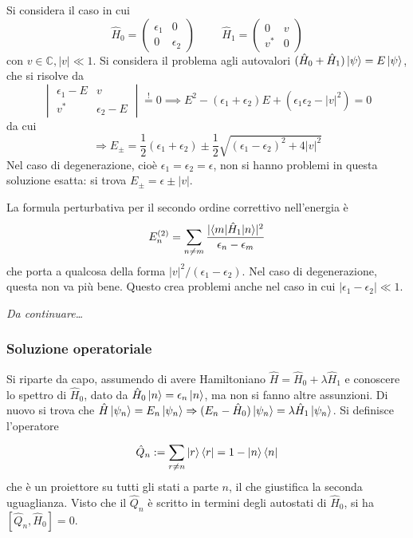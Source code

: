 \documentclass[11pt, a4paper]{scrartcl} %
\numberwithin{equation}{subsection}
\theoremstyle{style2}
\theoremstyle{style1}
\begin{document}
Si considera il caso in cui 
\[
	\hat{H}_0 = \begin{pmatrix} \epsilon _1 & 0 \\ 0& \epsilon _2 \end{pmatrix} \hspace{1cm}\hat{H}_1 = \begin{pmatrix} 0 & v \\ v^* & 0\end{pmatrix}  
\] 
con $v \in \mathbb{C}, \lvert v \rvert \ll 1$.
Si considera il problema agli autovalori $(\hat{H}_0 + \hat{H}_1) \ket{\psi } = E \ket{\psi } $, che si risolve da 
\[
		\begin{vmatrix} \epsilon _1 - E & v \\ v^* & \epsilon _2 - E \end{vmatrix} \stackrel{!}{=} 0 \implies E^2 - (\epsilon _1 + \epsilon _2) E + (\epsilon _1\epsilon _2 - \lvert v \rvert ^2 ) = 0 
\] 
da cui
\begin{equation}\label{2lsol}
		\Rightarrow E_{\pm} = \frac{1}{2}(\epsilon _1 + \epsilon _2) \pm \frac{1}{2}\sqrt{(\epsilon _1-\epsilon _2)^2 + 4 \lvert v \rvert ^2} 
\end{equation}
Nel caso di degenerazione, cio\`e $\epsilon _1 = \epsilon _{2}=\epsilon  $, non si hanno problemi in questa soluzione esatta: si trova $E_{\pm} = \epsilon \pm \lvert v \rvert $.

La formula perturbativa per il secondo ordine correttivo nell'energia \`e
\[
E_n^{(2)} = \sum_{n\neq m}^{} \frac{\lvert \braket{m|\hat{H}_1|n}  \rvert ^2}{\epsilon _n-\epsilon _m} 
\] 
che porta a qualcosa della forma $\lvert v \rvert ^2 / (\epsilon _1 - \epsilon _2)$.
Nel caso di degenerazione, questa non va pi\`u bene.
Questo crea problemi anche nel caso in cui $\lvert \epsilon _1 - \epsilon _2 \rvert \ll 1$.
\begin{center}
	\textit{Da continuare\ldots} 
\end{center}
\subsubsection{Soluzione operatoriale}

Si riparte da capo, assumendo di avere Hamiltoniano $\hat{H} = \hat{H}_0 + \lambda \hat{H}_1$ e conoscere lo spettro di $\hat{H}_0$, dato da $\hat{H}_0 \ket{n}  = \epsilon _n \ket{n} $, ma non si fanno altre assunzioni.
Di nuovo si trova che $\hat{H} \ket{\psi _n}  = E_n \ket{\psi _n}  \Rightarrow (E_n- \hat{H}_0) \ket{\psi _n}  = \lambda \hat{H}_1 \ket{\psi _n} $.
Si definisce l'operatore
\begin{equation}
	\hat{Q}_n := \sum_{r\neq n}^{} \ket{r} \bra{r} = 1 - \ket{n} \bra{n} 
\end{equation}
che \`e un proiettore su tutti gli stati a parte $n$, il che giustifica la seconda uguaglianza.
Visto che il $\hat{Q}_n$ \`e scritto in termini degli autostati di $\hat{H}_0$, si ha $[\hat{Q}_n , \hat{H}_0] = 0 $.
\end{document}

